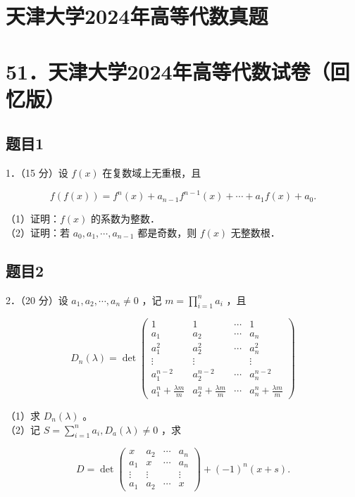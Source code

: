 \documentclass{article}
\begin{document}
\section*{天津大学2024年高等代数真题}
\section*{51．天津大学2024年高等代数试卷（回忆版）}

\subsection{题目1}
1．（15 分）设 \(f(x)\) 在复数域上无重根，且

\[
f(f(x))=f^{n}(x)+a_{n-1} f^{n-1}(x)+\cdots+a_{1} f(x)+a_{0} .
\]

（1）证明：\(f(x)\) 的系数为整数．\\
（2）证明：若 \(a_{0}, a_{1}, \cdots, a_{n-1}\) 都是奇数，则 \(f(x)\) 无整数根．

\subsection{题目2}
2．（20 分）设 \(a_{1}, a_{2}, \cdots, a_{n} \neq 0\) ，记 \(m=\prod_{i=1}^{n} a_{i}\) ，且

\[
D_{n}(\lambda)=\operatorname{det}\left(\begin{array}{cccc}
1 & 1 & \cdots & 1 \\
a_{1} & a_{2} & \cdots & a_{n} \\
a_{1}^{2} & a_{2}^{2} & \cdots & a_{n}^{2} \\
\vdots & \vdots & & \vdots \\
a_{1}^{n-2} & a_{2}^{n-2} & \cdots & a_{n}^{n-2} \\
a_{1}^{n}+\frac{\lambda m}{m} & a_{2}^{n}+\frac{\lambda m}{m} & \cdots & a_{n}^{n}+\frac{\lambda m}{m}
\end{array}\right)
\]

（1）求 \(D_{n}(\lambda)\) 。\\
（2）记 \(S=\sum_{i=1}^{n} a_{i}, D_{a}(\lambda) \neq 0\) ，求

\[
D=\operatorname{det}\left(\begin{array}{cccc}
x & a_{2} & \cdots & a_{n} \\
a_{1} & x & \cdots & a_{n} \\
\vdots & \vdots & & \vdots \\
a_{1} & a_{2} & \cdots & x
\end{array}\right)+(-1)^{n}(x+s) .
\]
\end{document}
